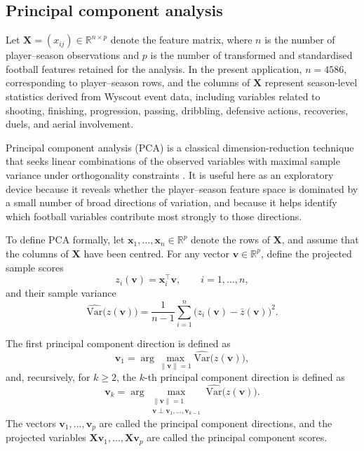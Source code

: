 \subsection{Principal component analysis}

Let $\mathbf{X}=(x_{ij})\in\mathbb{R}^{n\times p}$ denote the feature matrix, where $n$ is the number of player--season observations and $p$ is the number of transformed and standardised football features retained for the analysis. In the present application, $n=4586$, corresponding to player--season rows, and the columns of $\mathbf{X}$ represent season-level statistics derived from Wyscout event data, including variables related to shooting, finishing, progression, passing, dribbling, defensive actions, recoveries, duels, and aerial involvement.

Principal component analysis (PCA) is a classical dimension-reduction technique that seeks linear combinations of the observed variables with maximal sample variance under orthogonality constraints \cite{jolliffe2002pca}. It is useful here as an exploratory device because it reveals whether the player--season feature space is dominated by a small number of broad directions of variation, and because it helps identify which football variables contribute most strongly to those directions.

To define PCA formally, let $\mathbf{x}_1,\ldots,\mathbf{x}_n\in\mathbb{R}^p$ denote the rows of $\mathbf{X}$, and assume that the columns of $\mathbf{X}$ have been centred. For any vector $\mathbf{v}\in\mathbb{R}^p$, define the projected sample scores
\[
z_i(\mathbf{v})=\mathbf{x}_i^\top \mathbf{v}, \qquad i=1,\ldots,n,
\]
and their sample variance
\[
\widehat{\mathrm{Var}}\bigl(z(\mathbf{v})\bigr)
=
\frac{1}{n-1}\sum_{i=1}^n \bigl(z_i(\mathbf{v})-\bar z(\mathbf{v})\bigr)^2.
\]

\begin{definition}
The first principal component direction is defined as
\[
\mathbf{v}_1
=
\arg\max_{\|\mathbf{v}\|=1}\widehat{\mathrm{Var}}\bigl(z(\mathbf{v})\bigr),
\]
and, recursively, for $k\geq 2$, the $k$-th principal component direction is defined as
\[
\mathbf{v}_k
=
\arg\max_{\substack{\|\mathbf{v}\|=1\\ \mathbf{v}\perp \mathbf{v}_1,\ldots,\mathbf{v}_{k-1}}}
\widehat{\mathrm{Var}}\bigl(z(\mathbf{v})\bigr).
\]
The vectors $\mathbf{v}_1,\ldots,\mathbf{v}_p$ are called the principal component directions, and the projected variables $\mathbf{X}\mathbf{v}_1,\ldots,\mathbf{X}\mathbf{v}_p$ are called the principal component scores.
\end{definition}

